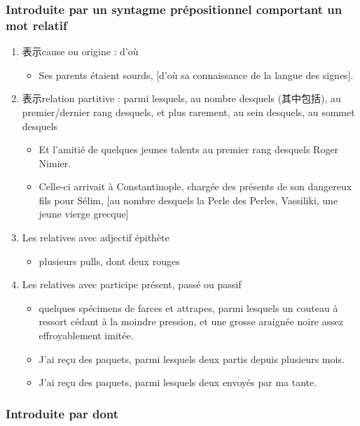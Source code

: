 \documentclass[UTF8]{report}
\begin{document}
\subsubsection{Introduite par un syntagme prépositionnel comportant un mot relatif}
\begin{enumerate}
    \item 表示cause ou origine : d’où
    \begin{itemize}
        \item Ses parents étaient sourds, [d’où sa connaissance de la langue des signes].
    \end{itemize}
    \item 表示relation partitive : parmi lesquels, au nombre desquels (其中包括), au premier/dernier rang desquels, et plus rarement, au sein desquels, au sommet desquels
    \begin{itemize}
        \item Et l’amitié de quelques jeunes talents au premier rang desquels Roger Nimier. 
        \item Celle-ci arrivait à Constantinople, chargée des présents de son dangereux fils pour Sélim, [au nombre desquels la Perle des Perles, Vassiliki, une jeune vierge grecque]
    \end{itemize}
    \item Les relatives avec adjectif épithète
    \begin{itemize}
        \item plusieurs pulls, dont deux rouges
    \end{itemize}
    \item Les relatives avec participe présent, passé ou passif
    \begin{itemize}
        \item quelques spécimens de farces et attrapes, parmi lesquels un couteau à ressort cédant à la moindre pression, et une grosse araignée noire assez effroyablement imitée.
        \item J’ai reçu des paquets, parmi lesquels deux partis depuis plusieurs mois.
        \item J’ai reçu des paquets, parmi lesquels deux envoyés par ma tante.
    \end{itemize} 
\end{enumerate}

\subsubsection{Introduite par dont}
\end{document}
